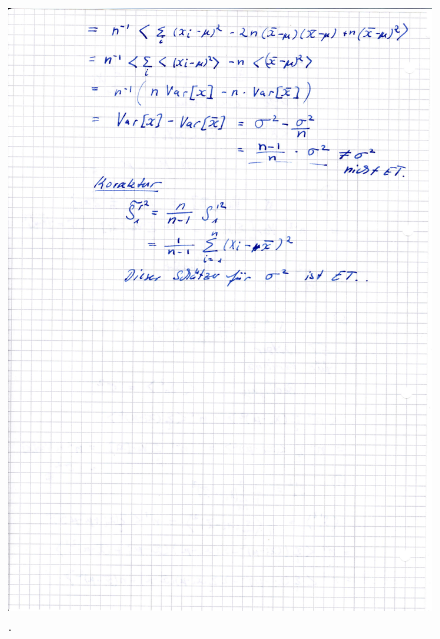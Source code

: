 \begin{figure}
  \centering
  \includegraphics[width=\textwidth]{pictures/bild22.pdf}
  \caption{.}
  \label{fig:bild22}
\end{figure}
